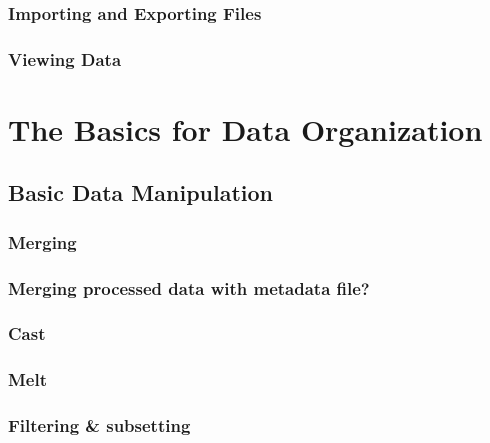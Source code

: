 \documentclass[
]{book}
\begin{document}
\hypertarget{importing-and-exporting-files}{%
\subsection{Importing and Exporting Files}\label{importing-and-exporting-files}}

\hypertarget{viewing-data}{%
\subsection{Viewing Data}\label{viewing-data}}

\hypertarget{dataorg}{%
\chapter{The Basics for Data Organization}\label{dataorg}}

\hypertarget{basic-data-manipulation}{%
\section{Basic Data Manipulation}\label{basic-data-manipulation}}

\hypertarget{merging}{%
\subsection{Merging}\label{merging}}

\hypertarget{merging-processed-data-with-metadata-file}{%
\subsection{Merging processed data with metadata file?}\label{merging-processed-data-with-metadata-file}}

\hypertarget{cast}{%
\subsection{Cast}\label{cast}}

\hypertarget{melt}{%
\subsection{Melt}\label{melt}}

\hypertarget{filtering-subsetting}{%
\subsection{Filtering \& subsetting}\label{filtering-subsetting}}
\end{document}
